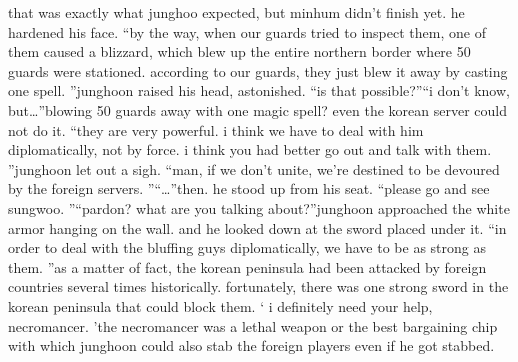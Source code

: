 that was exactly what junghoo expected, but minhum didn’t finish yet.
 he hardened his face.
“by the way, when our guards tried to inspect them, one of them caused a blizzard, which blew up the entire northern border where 50 guards were stationed.
 according to our guards, they just blew it away by casting one spell.
”junghoon raised his head, astonished.
“is that possible?”“i don’t know, but…”blowing 50 guards away with one magic spell? even the korean server could not do it.
“they are very powerful.
 i think we have to deal with him diplomatically, not by force.
 i think you had better go out and talk with them.
”junghoon let out a sigh.
“man, if we don’t unite, we’re destined to be devoured by the foreign servers.
”“…”then.
 he stood up from his seat.
“please go and see sungwoo.
”“pardon? what are you talking about?”junghoon approached the white armor hanging on the wall.
 and he looked down at the sword placed under it.
“in order to deal with the bluffing guys diplomatically, we have to be as strong as them.
”as a matter of fact, the korean peninsula had been attacked by foreign countries several times historically.
fortunately, there was one strong sword in the korean peninsula that could block them.
‘ i definitely need your help, necromancer.
’the necromancer was a lethal weapon or the best bargaining chip with which junghoon could also stab the foreign players even if he got stabbed.


 